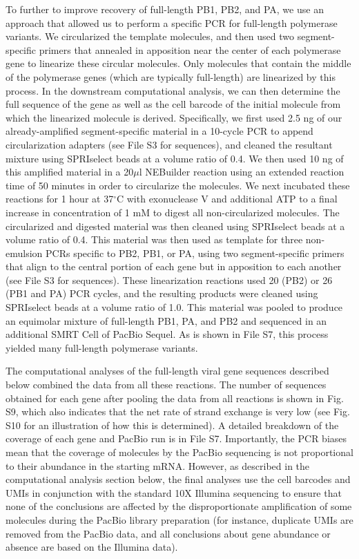 \documentclass[]{article}
\begin{document}
To further to improve recovery of full-length PB1, PB2, and PA, we use an approach that allowed us to perform a specific PCR for full-length polymerase variants.
We circularized the template molecules, and then used two segment-specific primers that annealed in apposition near the center of each polymerase gene to linearize these circular molecules.
Only molecules that contain the middle of the polymerase genes (which are typically full-length) are linearized by this process.
In the downstream computational analysis, we can then determine the full sequence of the gene as well as the cell barcode of the initial molecule from which the linearized molecule is derived.
Specifically, we first used 2.5 ng of our already-amplified segment-specific material in a 10-cycle PCR to append circularization adapters (see File S3 for sequences), and cleaned the resultant mixture using SPRIselect beads at a volume ratio of 0.4.
We then used 10 ng of this amplified material in a 20$\mu$l NEBuilder reaction using an extended reaction time of 50 minutes in order to circularize the molecules.
We next incubated these reactions for 1 hour at 37$^{\circ}$C with exonuclease V and additional ATP to a final increase in concentration of 1 mM to digest all non-circularized molecules.
The circularized and digested material was then cleaned using SPRIselect beads at a volume ratio of 0.4.
This material was then used as template for three non-emulsion PCRs specific to PB2, PB1, or PA, using two segment-specific primers that align to the central portion of each gene but in apposition to each another (see File S3 for sequences).
These linearization reactions used 20 (PB2) or 26 (PB1 and PA) PCR cycles, and the resulting products were cleaned using SPRIselect beads at a volume ratio of 1.0.
This material was pooled to produce an equimolar mixture of full-length PB1, PA, and PB2 and sequenced in an additional SMRT Cell of PacBio Sequel. 
As is shown in File S7, this process yielded many full-length polymerase variants.

The computational analyses of the full-length viral gene sequences described below combined the data from all these reactions.
The number of sequences obtained for each gene after pooling the data from all reactions is shown in Fig. S9, which also indicates that the net rate of strand exchange is very low (see Fig. S10 for an illustration of how this is determined).
A detailed breakdown of the coverage of each gene and PacBio run is in File S7.
Importantly, the PCR biases mean that the coverage of molecules by the PacBio sequencing is not proportional to their abundance in the starting mRNA.
However, as described in the computational analysis section below, the final analyses use the cell barcodes and UMIs in conjunction with the standard 10X Illumina sequencing to ensure that none of the conclusions are affected by the disproportionate amplification of some molecules during the PacBio library preparation (for instance, duplicate UMIs are removed from the PacBio data, and all conclusions about gene abundance or absence are based on the Illumina data).
\end{document}
